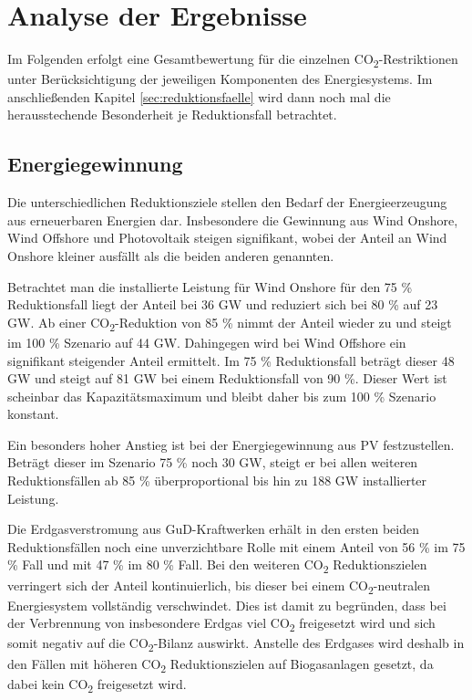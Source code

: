 \section{Analyse der Ergebnisse}
\label{sec:gesamtanalyse}
Im Folgenden erfolgt eine Gesamtbewertung für die einzelnen CO\textsubscript{2}-Restriktionen unter Berücksichtigung der jeweiligen Komponenten des Energiesystems. Im anschließenden Kapitel \ref{sec:reduktionsfaelle} wird dann noch mal die herausstechende Besonderheit je Reduktionsfall betrachtet. 

\subsection{Energiegewinnung}
Die unterschiedlichen Reduktionsziele stellen den Bedarf der Energieerzeugung aus erneuerbaren Energien dar. Insbesondere die Gewinnung aus Wind Onshore, Wind Offshore und Photovoltaik steigen signifikant, wobei der Anteil an Wind Onshore kleiner ausfällt als die beiden anderen genannten. 

Betrachtet man die installierte Leistung für Wind Onshore für den 75 \% Reduktionsfall liegt der Anteil bei 36 GW und reduziert sich bei 80 \% auf 23 GW. Ab einer CO\textsubscript{2}-Reduktion von 85 \% nimmt der Anteil wieder zu und steigt im 100 \% Szenario auf 44 GW. 
Dahingegen wird bei Wind Offshore ein signifikant steigender Anteil ermittelt. Im 75 \% Reduktionsfall beträgt dieser 48 GW und steigt auf 81 GW bei einem Reduktionsfall von 90 \%. Dieser Wert ist scheinbar das Kapazitätsmaximum und bleibt daher bis zum 100 \% Szenario konstant.

Ein besonders hoher Anstieg ist bei der Energiegewinnung aus PV festzustellen. Beträgt dieser im Szenario 75 \% noch 30 GW, steigt er bei allen weiteren Reduktionsfällen ab 85 \% überproportional bis hin zu 188 GW installierter Leistung.


Die Erdgasverstromung aus GuD-Kraftwerken erhält in den ersten beiden Reduktionsfällen noch eine unverzichtbare Rolle mit einem Anteil von 56 \% im 75 \% Fall und mit 47 \% im 80 \% Fall. Bei den weiteren CO\textsubscript{2} Reduktionszielen verringert sich der Anteil kontinuierlich, bis dieser bei einem CO\textsubscript{2}-neutralen Energiesystem vollständig verschwindet. Dies ist damit zu begründen, dass bei der Verbrennung von insbesondere Erdgas viel CO\textsubscript{2} freigesetzt wird und sich somit negativ auf die CO\textsubscript{2}-Bilanz auswirkt. Anstelle des Erdgases wird deshalb in den Fällen mit höheren CO\textsubscript{2} Reduktionszielen auf Biogasanlagen gesetzt, da dabei kein CO\textsubscript{2} freigesetzt wird. 


